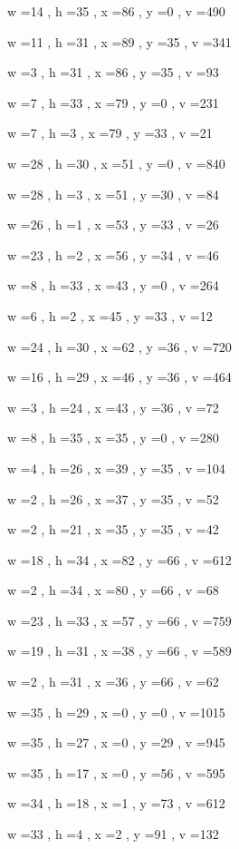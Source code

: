 \documentclass[11pt]{article}
\begin{document}
w =14 , h =35 , x =86 , y =0 , v =490
\par
w =11 , h =31 , x =89 , y =35 , v =341
\par
w =3 , h =31 , x =86 , y =35 , v =93
\par
w =7 , h =33 , x =79 , y =0 , v =231
\par
w =7 , h =3 , x =79 , y =33 , v =21
\par
w =28 , h =30 , x =51 , y =0 , v =840
\par
w =28 , h =3 , x =51 , y =30 , v =84
\par
w =26 , h =1 , x =53 , y =33 , v =26
\par
w =23 , h =2 , x =56 , y =34 , v =46
\par
w =8 , h =33 , x =43 , y =0 , v =264
\par
w =6 , h =2 , x =45 , y =33 , v =12
\par
w =24 , h =30 , x =62 , y =36 , v =720
\par
w =16 , h =29 , x =46 , y =36 , v =464
\par
w =3 , h =24 , x =43 , y =36 , v =72
\par
w =8 , h =35 , x =35 , y =0 , v =280
\par
w =4 , h =26 , x =39 , y =35 , v =104
\par
w =2 , h =26 , x =37 , y =35 , v =52
\par
w =2 , h =21 , x =35 , y =35 , v =42
\par
w =18 , h =34 , x =82 , y =66 , v =612
\par
w =2 , h =34 , x =80 , y =66 , v =68
\par
w =23 , h =33 , x =57 , y =66 , v =759
\par
w =19 , h =31 , x =38 , y =66 , v =589
\par
w =2 , h =31 , x =36 , y =66 , v =62
\par
w =35 , h =29 , x =0 , y =0 , v =1015
\par
w =35 , h =27 , x =0 , y =29 , v =945
\par
w =35 , h =17 , x =0 , y =56 , v =595
\par
w =34 , h =18 , x =1 , y =73 , v =612
\par
w =33 , h =4 , x =2 , y =91 , v =132
\par
\newpage
\end{document}
